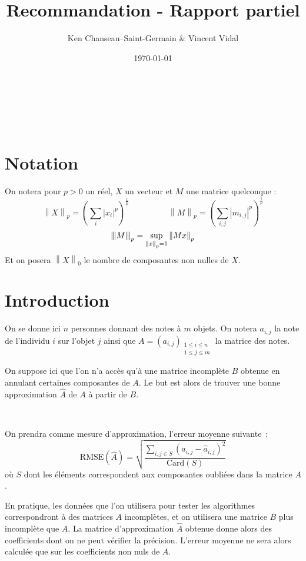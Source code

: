 \documentclass[12pt, a4paper]{article}
\newcommand{\A}{A} %
\newcommand{\B}{B} %
\newcommand{\Ap}{\widehat{A}} %
\newcommand{\Ac}[2]{a_{#1,#2}} %
\newcommand{\Apc}[2]{\widehat{a}_{#1,#2}} %
\newcommand{\rmse}[1]{\mathrm{RMSE}\pp{#1}} %
\newcommand{\norme}[2]{\left\lVert #1 \right\rVert_{#2}} %
\newcommand{\tnorme}[2]{\left|\hspace{-1pt}\left\lVert #1
			\right\rVert\hspace{-1pt}\right|_{#2}} %
\newcommand{\pp}[1]{\left(#1\right)} %
\newcommand{\sdl}{

~

} %
\begin{document}
\title{Recommandation - Rapport partiel}
\author{Ken Chanseau--Saint-Germain \& Vincent Vidal}
\date{\today}
\maketitle

\tableofcontents
\sdl\sdl
\section*{Notation}
On notera pour $p>0$ un réel, $X$ un vecteur et $M$ une matrice quelconque : \[
	\norme{X}{p} = \pp{\sum_i \left|x_i\right|^p}^{\frac{1}{p}} \hspace{2cm} 
	\norme{M}{p} = \pp{\sum_{i, j} \left|m_{i,j}\right|^p}^{\frac{1}{p}}
\]\[
	\tnorme{M}{p} = \sup_{\norme{x}{p}=1} \norme{Mx}{p}
\]
Et on posera $\norme{X}{0}$ le nombre de composantes non nulles de $X$. 

\newpage
\hspace{1cm}
\section{Introduction}
On se donne ici $n$ personnes donnant des notes à $m$ objets.\newline
On notera $\Ac{i}{j}$ la note de l'individu $i$ sur l'objet $j$ ainsi que
$A = \pp{\Ac{i}{j}}_{\substack{1\leq i\leq n \\ 1 \leq j \leq m}}$
la matrice des notes.

On suppose ici que l'on n'a accès qu'à une matrice incomplète $\B$ obtenue
en annulant certaines composantes de $A$. Le but est alors de trouver
une bonne approximation $\Ap$ de $A$ à partir de $\B$.
\sdl

On prendra comme mesure d'approximation, l'erreur moyenne suivante~: \[
	\rmse{\Ap} = \sqrt{\frac{\sum_{i,j \in S} \pp{\Ac{i}{j} - \Apc{i}{j}}^2}{\mathrm{Card}\pp{S}}}
\]
où $S$ dont les éléments correspondent aux composantes oubliées dans la matrice $\A$.

En pratique, les données que l'on utilisera pour tester les algorithmes
correspondront à des matrices $\A$ incomplètes, et on utilisera
une matrice $\B$ plus incomplète que $\A$. La matrice d'approximation
$\Ap$ obtenue donne alors des coefficients dont on ne peut vérifier
la précision. L'erreur moyenne ne sera alors calculée que sur les
coefficients non nuls de $\A$.

\end{document}
